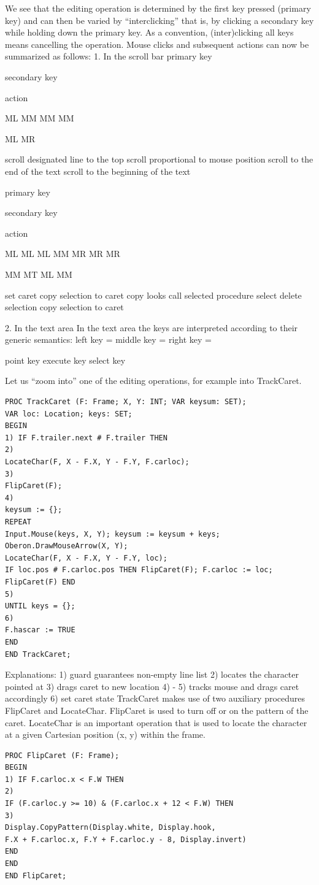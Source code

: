 We see that the editing operation is determined by the first key pressed (primary key) and can then
be varied by “interclicking” that is, by clicking a secondary key while holding down the primary key.
As a convention, (inter)clicking all keys means cancelling the operation. Mouse clicks and
subsequent actions can now be summarized as follows:
1. In the scroll bar
primary key

secondary key

action

ML
MM
MM
MM

ML
MR

scroll designated line to the top
scroll proportional to mouse position
scroll to the end of the text
scroll to the beginning of the text

primary key

secondary key

action

ML
ML
ML
MM
MR
MR
MR

MM
MT
ML
MM

set caret
copy selection to caret
copy looks
call selected procedure
select
delete selection
copy selection to caret

2. In the text area
In the text area the keys are interpreted according to their generic semantics:
left key =
middle key =
right key =

point key
execute key
select key

Let us “zoom into” one of the editing operations, for example into TrackCaret.
\begin{verbatim}
PROC TrackCaret (F: Frame; X, Y: INT; VAR keysum: SET);
VAR loc: Location; keys: SET;
BEGIN
1) IF F.trailer.next # F.trailer THEN
2)
LocateChar(F, X - F.X, Y - F.Y, F.carloc);
3)
FlipCaret(F);
4)
keysum := {};
REPEAT
Input.Mouse(keys, X, Y); keysum := keysum + keys;
Oberon.DrawMouseArrow(X, Y);
LocateChar(F, X - F.X, Y - F.Y, loc);
IF loc.pos # F.carloc.pos THEN FlipCaret(F); F.carloc := loc; FlipCaret(F) END
5)
UNTIL keys = {};
6)
F.hascar := TRUE
END
END TrackCaret;
\end{verbatim}

Explanations:
1) guard guarantees non-empty line list
2) locates the character pointed at
3) drags caret to new location
4) - 5) tracks mouse and drags caret accordingly
6) set caret state
TrackCaret makes use of two auxiliary procedures FlipCaret and LocateChar. FlipCaret is used to
turn off or on the pattern of the caret. LocateChar is an important operation that is used to locate
the character at a given Cartesian position (x, y) within the frame.
\begin{verbatim}
PROC FlipCaret (F: Frame);
BEGIN
1) IF F.carloc.x < F.W THEN
2)
IF (F.carloc.y >= 10) & (F.carloc.x + 12 < F.W) THEN
3)
Display.CopyPattern(Display.white, Display.hook,
F.X + F.carloc.x, F.Y + F.carloc.y - 8, Display.invert)
END
END
END FlipCaret;
\end{verbatim}


